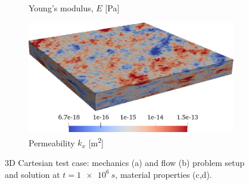 \begin{figure} [htbp]
\begin{subfigure}{0.48\textwidth}
	    \caption{Young's modulus, $E$ [Pa]}
        \label{fig:cart_young}
    \end{subfigure}
    \hfill
    \begin{subfigure}{0.48\textwidth}
        \includegraphics[width=0.9\linewidth]{figs/Cart/perm}
	    \caption{Permeability $k_x$ [\unit{m^2}]}
        \label{fig:cart_perm}
    \end{subfigure}
    \caption[3D Cartesian test case]{3D Cartesian test case: mechanics (a) and flow (b) problem setup and solution at $t = \qty{1e6}{s}$, material properties (c,d).}
    \label{fig:cart_setup}
\end{figure}

